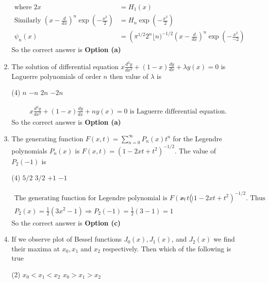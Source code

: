 \begin{enumerate}[label=\color{ocre}\textbf{\arabic*.}]
\begin{answer}
\begin{align*}
	\text{where }2 x&=H_{1}(x)\\
	\text{Similarly }\left(x-\frac{d}{d x}\right)^{n} \exp \left(-\frac{x^{2}}{2}\right)&=H_{n} \exp \left(-\frac{x^{2}}{2}\right)\\
	\psi_{n}(x)&=\left(\pi^{1 / 2} 2^{n}\lfloor n)^{-1 / 2}\left(x-\frac{d}{d x}\right)^{n} \exp \left(-\frac{x^{2}}{-2}\right)\right.
	\end{align*}
	So the correct answer is \textbf{Option (a)}
\end{answer}
\item The solution of differential equation $x \frac{d^{2} y}{d x^{2}}+(1-x) \frac{d y}{d x}+\lambda y(x)=0$ is Laguerre polynomials of order $n$ then value of $\lambda$ is
 \begin{tasks}(4)
	\task[\textbf{a.}]$n$
	\task[\textbf{b.}]$-n$
	\task[\textbf{c.}] $2 n$
	\task[\textbf{d.}] $-2 n$
\end{tasks}
\begin{answer}
	\begin{align*}
	x \frac{d^{2} y}{d x^{2}}+(1-x) \frac{d y}{d x}+n y(x)=0\text{ is Laguerre differential equation.}
	\end{align*}
	So the correct answer is \textbf{Option (a)}
\end{answer}
\item The generating function $F(x, t)=\sum_{n=0}^{\infty} P_{n}(x) t^{n}$ for the Legendre polynomials $P_{n}(x)$ is $F(x, t)=\left(1-2 x t+t^{2}\right)^{-1 / 2}$. The value of $P_{2}(-1)$ is
 \begin{tasks}(4)
	\task[\textbf{a.}]$5 / 2$
	\task[\textbf{b.}]$3 / 2$
	\task[\textbf{c.}] $+1$
	\task[\textbf{d.}] $-1$
\end{tasks}
\begin{answer}
	\begin{align*}
	\text{The generating function for Legendre polynomial is }F(x, t)&=\left(1-2 x t+t^{2}\right)^{-1 / 2}.\text{ Thus}\\P_{2}(x)=\frac{1}{2}\left(3 x^{2}-1\right) \Rightarrow P_{2}(-1)=\frac{1}{2}(3-1)=1
	\end{align*}
		So the correct answer is \textbf{Option (c)}
\end{answer}
\item If we observe plot of Bessel functions $J_{0}(x), J_{1}(x)$, and $J_{2}(x)$ we find their maxima at $x_{0}, x_{1}$ and $x_{2}$ respectively. Then which of the following is true
 \begin{tasks}(2)
	\task[\textbf{a.}]$x_{0}<x_{1}<x_{2}$
	\task[\textbf{b.}]$x_{0}>x_{1}>x_{2}$

\end{tasks}
\end{enumerate}
